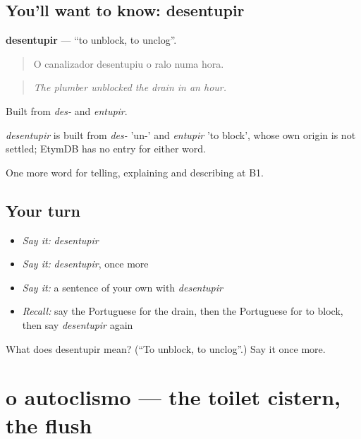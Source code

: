 \subsection*{You'll want to know: desentupir}
\textbf{desentupir} — \textquotedblleft{}to unblock, to unclog\textquotedblright{}.

\begin{quote}
O canalizador desentupiu o ralo numa hora.
\end{quote}

\begin{quote}
\emph{The plumber unblocked the drain in an hour.}
\end{quote}

Built from \emph{des-} and \emph{entupir}.

\begin{cousinweb}
\emph{desentupir} is built from \emph{des-} 'un-' and \emph{entupir} 'to block', whose own origin is not settled; EtymDB has no entry for either word.
\end{cousinweb}

\begin{grammarlens}[title={What you've built}]
One more word for telling, explaining and describing at B1.
\end{grammarlens}

\subsection*{Your turn}
\begin{itemize}
\raggedright
  \item \emph{Say it:} \emph{desentupir}
  \item \emph{Say it:} \emph{desentupir}, once more
  \item \emph{Say it:} a sentence of your own with \emph{desentupir}
  \item \emph{Recall:} say the Portuguese for the drain, then the Portuguese for to block, then say \emph{desentupir} again
\end{itemize}

\begin{tcolorbox}[breakable,colback=teal!4,colframe=teal!35!black,title={Before you move on}]
What does desentupir mean? (\textquotedblleft{}To unblock, to unclog\textquotedblright{}.) Say it once more.
\end{tcolorbox}
\section[o autoclismo]{o autoclismo — the toilet cistern, the flush}

